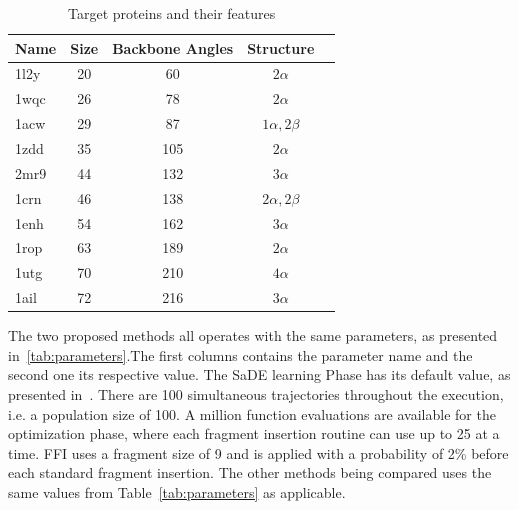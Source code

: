 \begin{table}[bh]
  \centering
  \begin{tabular}{ l | c | c | c | c }
    \hline \hline
    Name & Size & Backbone Angles & Structure         \\ \hline \hline
    1l2y & 20   & 60              & $2\alpha$         \\ \hline
    1wqc & 26   & 78              & $2\alpha$         \\ \hline
    1acw & 29   & 87              & $1\alpha, 2\beta$ \\ \hline
    1zdd & 35   & 105             & $2\alpha$         \\ \hline
    2mr9 & 44   & 132             & $3\alpha$         \\ \hline
    1crn & 46   & 138             & $2\alpha, 2\beta$ \\ \hline
    1enh & 54   & 162             & $3\alpha$         \\ \hline
    1rop & 63   & 189             & $2\alpha$         \\ \hline
    1utg & 70   & 210             & $4\alpha$         \\ \hline
    1ail & 72   & 216             & $3\alpha$         \\ \hline
    \hline
  \end{tabular}
  \caption{Target proteins and their features}
  \label{tab:protein-targets}
\end{table}



The two proposed methods all operates with the same parameters, as presented
in~\ref{tab:parameters}.The first columns contains the parameter name and the
second one its respective value. The SaDE learning Phase has its default value,
as presented in~\cite{qin2009differential}. There are 100 simultaneous
trajectories throughout the execution, i.e. a population size of 100. A million
function evaluations are available for the optimization phase, where each
fragment insertion routine can use up to 25 at a time. \ac{FFI} uses a fragment
size of 9 and is applied with a probability of 2\% before each standard fragment
insertion. The other methods being compared uses the same values from
Table~\ref{tab:parameters} as applicable.

